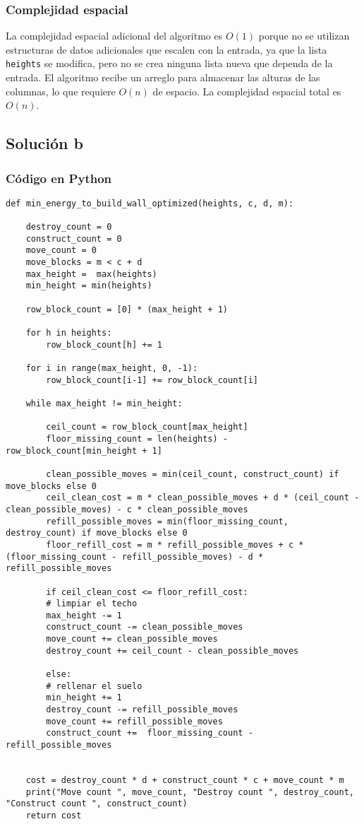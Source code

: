 \documentclass[a4paper,12pt]{article}
\begin{document}
\subsubsection{Complejidad espacial}

La complejidad espacial adicional del algoritmo es \( O(1) \) porque no se utilizan estructuras de datos adicionales que escalen con la entrada, ya que la lista \texttt{heights} se modifica, pero no se crea ninguna lista nueva que dependa de la entrada. El algoritmo recibe un arreglo para almacenar las alturas de las columnas, lo que requiere \( O(n) \) de espacio. La complejidad espacial total es \( O(n) \).

\subsection{Solución b}

\subsubsection{Código en Python}
\begin{lstlisting}
def min_energy_to_build_wall_optimized(heights, c, d, m):

	destroy_count = 0
	construct_count = 0
	move_count = 0
	move_blocks = m < c + d
	max_height =  max(heights)
	min_height = min(heights)

	row_block_count = [0] * (max_height + 1)

	for h in heights:
		row_block_count[h] += 1

	for i in range(max_height, 0, -1):
		row_block_count[i-1] += row_block_count[i]

	while max_height != min_height:   

		ceil_count = row_block_count[max_height]
		floor_missing_count = len(heights) - row_block_count[min_height + 1] 

		clean_possible_moves = min(ceil_count, construct_count) if move_blocks else 0
		ceil_clean_cost = m * clean_possible_moves + d * (ceil_count - clean_possible_moves) - c * clean_possible_moves
		refill_possible_moves = min(floor_missing_count, destroy_count) if move_blocks else 0
		floor_refill_cost = m * refill_possible_moves + c * (floor_missing_count - refill_possible_moves) - d * refill_possible_moves

		if ceil_clean_cost <= floor_refill_cost:
		# limpiar el techo
		max_height -= 1
		construct_count -= clean_possible_moves
		move_count += clean_possible_moves
		destroy_count += ceil_count - clean_possible_moves

		else: 
		# rellenar el suelo
		min_height += 1
		destroy_count -= refill_possible_moves
		move_count += refill_possible_moves
		construct_count +=  floor_missing_count - refill_possible_moves


	cost = destroy_count * d + construct_count * c + move_count * m
	print("Move count ", move_count, "Destroy count ", destroy_count, "Construct count ", construct_count)
	return cost
\end{lstlisting}
\end{document}
